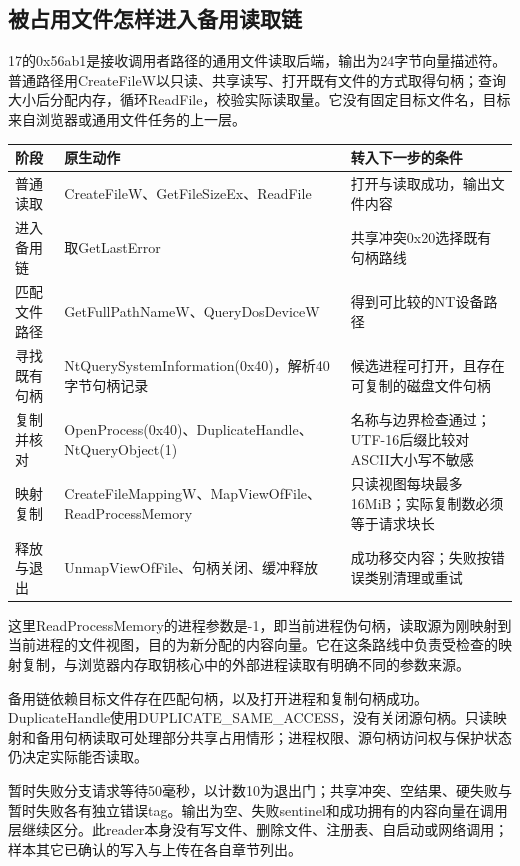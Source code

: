 \documentclass[UTF8,a4paper,zihao=5,fontset=windows]{ctexart}
\newcommand{\code}[1]{{\ttfamily\small #1}}
\begin{document}
\subsection{被占用文件怎样进入备用读取链}
17的\code{0x56ab1}是接收调用者路径的通用文件读取后端，输出为24字节向量描述符。普通路径用\code{CreateFileW}以只读、共享读写、打开既有文件的方式取得句柄；查询大小后分配内存，循环\code{ReadFile}，校验实际读取量。它没有固定目标文件名，目标来自浏览器或通用文件任务的上一层。

\begin{longtable}{@{}L{32mm}L{69mm}L{49mm}@{}}\toprule 阶段 & 原生动作 & 转入下一步的条件\\\midrule\endhead
普通读取 & \code{CreateFileW}、\code{GetFileSizeEx}、\code{ReadFile} & 打开与读取成功，输出文件内容\\
进入备用链 & 取\code{GetLastError} & 共享冲突\code{0x20}选择既有句柄路线\\
匹配文件路径 & \code{GetFullPathNameW}、\code{QueryDosDeviceW} & 得到可比较的NT设备路径\\
寻找既有句柄 & \code{NtQuerySystemInformation(0x40)}，解析40字节句柄记录 & 候选进程可打开，且存在可复制的磁盘文件句柄\\
复制并核对 & \code{OpenProcess(0x40)}、\code{DuplicateHandle}、\code{NtQueryObject(1)} & 名称与边界检查通过；UTF-16后缀比较对ASCII大小写不敏感\\
映射复制 & \code{CreateFileMappingW}、\code{MapViewOfFile}、\code{ReadProcessMemory} & 只读视图每块最多16MiB；实际复制数必须等于请求块长\\
释放与退出 & \code{UnmapViewOfFile}、句柄关闭、缓冲释放 & 成功移交内容；失败按错误类别清理或重试\\\bottomrule\end{longtable}

这里\code{ReadProcessMemory}的进程参数是\code{-1}，即当前进程伪句柄，读取源为刚映射到当前进程的文件视图，目的为新分配的内容向量。它在这条路线中负责受检查的映射复制，与浏览器内存取钥核心中的外部进程读取有明确不同的参数来源。

备用链依赖目标文件存在匹配句柄，以及打开进程和复制句柄成功。\code{DuplicateHandle}使用\code{DUPLICATE\_SAME\_ACCESS}，没有关闭源句柄。只读映射和备用句柄读取可处理部分共享占用情形；进程权限、源句柄访问权与保护状态仍决定实际能否读取。

暂时失败分支请求等待50毫秒，以计数10为退出门；共享冲突、空结果、硬失败与暂时失败各有独立错误tag。输出为空、失败sentinel和成功拥有的内容向量在调用层继续区分。此reader本身没有写文件、删除文件、注册表、自启动或网络调用；样本其它已确认的写入与上传在各自章节列出。
\end{document}
